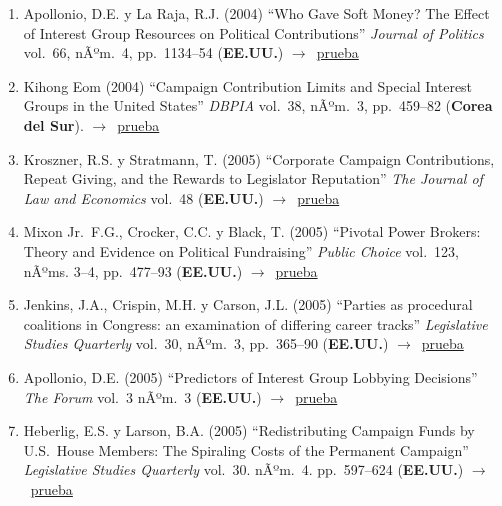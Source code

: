 \documentclass[12 pt, letter]{article}
\newenvironment{CitasMiTrabajo}{
    \begin{footnotesize}
    \begin{enumerate}[label={\footnotesize\emph{cita~\arabic*}},ref=\arabic*] %
        \setlength{\itemsep}{.1\itemsep}
        \setlength{\parskip}{.1\parskip}
    }{\end{enumerate}\end{footnotesize}}
\begin{document}
\begin{CitasMiTrabajo}
        \item Apollonio, D.E. y La Raja, R.J. (2004)
        ``Who Gave Soft Money?
        The Effect of Interest Group Resources on Political Contributions''
        \emph{Journal of Politics} vol.\ 66, nÃºm.\ 4, pp.\ 1134--54  (\textbf{EE.UU.}) $\rightarrow$~\href{http://ericmagar.com/cv/cites/coxMagar/apolRaja.pdf}{prueba}

        \item Kihong Eom (2004)
        ``Campaign Contribution
        Limits and Special Interest Groups in the United States'' \emph{DBPIA} vol.\
        38, nÃºm.\ 3, pp.\ 459--82  (\textbf{Corea del Sur}). $\rightarrow$~\href{http://ericmagar.com/cv/cites/coxMagar/eom.pdf}{prueba}

        \item Kroszner, R.S. y Stratmann, T. (2005)
        ``Corporate Campaign Contributions, Repeat Giving, and the Rewards to
        Legislator Reputation''
        \emph{The Journal of Law and Economics} vol.\ 48 (\textbf{EE.UU.}) $\rightarrow$~\href{http://ericmagar.com/cv/cites/coxMagar/kros.pdf}{prueba}

        \item Mixon Jr.\, F.G., Crocker, C.C. y Black, T. (2005)
        ``Pivotal Power Brokers:
        Theory and Evidence on Political Fundraising'' \emph{Public Choice} vol.\ 123,
        nÃºms. 3--4, pp.\ 477--93  (\textbf{EE.UU.}) $\rightarrow$~\href{http://ericmagar.com/cv/cites/coxMagar/mixon.pdf}{prueba}

        \item Jenkins, J.A., Crispin, M.H. y Carson, J.L. (2005)
        ``Parties as procedural coalitions in Congress: an examination of differing career tracks''
        \emph{Legislative Studies Quarterly} vol.\ 30, nÃºm.\ 3, pp.\ 365--90  (\textbf{EE.UU.}) $\rightarrow$~\href{http://ericmagar.com/cv/cites/coxMagar/jenkinsetal2005lsq.pdf}{prueba}

       \item Apollonio, D.E. (2005) ``Predictors of Interest Group Lobbying Decisions'' \emph{The Forum} vol.\ 3 nÃºm.\ 3 (\textbf{EE.UU.}) $\rightarrow$~\href{http://ericmagar.com/cv/cites/coxMagar/Apollonio2005.pdf}{prueba}

       \item Heberlig, E.S. y Larson, B.A. (2005) ``Redistributing Campaign Funds by U.S.\ House Members: The Spiraling Costs of the Permanent Campaign'' \emph{Legislative Studies Quarterly} vol.\ 30. nÃºm.\ 4. pp.\ 597--624 (\textbf{EE.UU.}) $\rightarrow$~\href{http://ericmagar.com/cv/cites/coxMagar/heberlig+larson2005lsq.excerpt.pdf}{prueba}


\end{CitasMiTrabajo}
\end{document}
